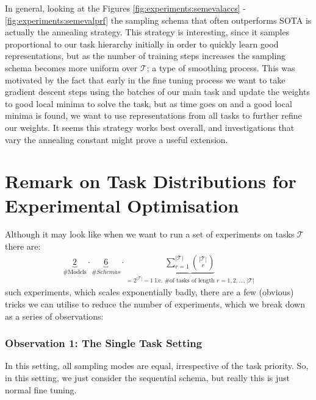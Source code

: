 In general, looking at the Figures \ref{fig:experiments:semevalaccs} - \ref{fig:experiments:semevalprf} the sampling schema that often outperforms SOTA is actually the annealing strategy. This strategy is interesting, since it samples proportional to our task hierarchy initially in order to quickly learn good representations, but as the number of training steps increases the sampling schema becomes more uniform over $\mathcal{T}$; a type of smoothing process. This was motivated by the fact that early in the fine tuning process we want to take gradient descent steps using the batches of our main task and update the weights to good local minima to solve the task, but as time goes on and a good local minima is found, we want to use representations from all tasks to further refine our weights. It seems this strategy works best overall, and investigations that vary the annealing constant might prove a useful extension.

\section{Remark on Task Distributions for Experimental Optimisation} \label{section:experiments:taskdistributions}
Although it may look like when we want to run a set of experiments on tasks $\mathcal{T}$ there are:
\begin{align*}
\underbrace{2}_{\text{\#Models}} \cdot \underbrace{6}_{\#Schemas} \cdot \underbrace{\sum \limits_{r=1}^{|\mathcal{T}|} {|\mathcal{T}| \choose r}}_{=2^{|\mathcal{T}|} - 1 \text{ i.e. \# of tasks of length } r= 1,2,\dots, |\mathcal{T}|}
\end{align*}
such experiments, which scales exponentially badly, there are a few (obvious) tricks we can utilise to reduce the number of experiments, which we break down as a series of observations:
\subsubsection{Observation 1: The Single Task Setting}
In this setting, all sampling modes are equal, irrespective of the task priority. So, in this setting, we just consider the sequential schema, but really this is just normal fine tuning.

